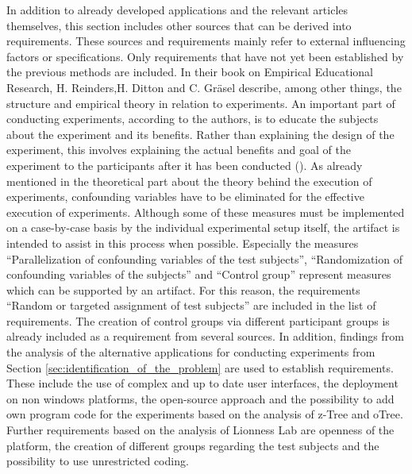   In addition to already developed applications and the relevant articles themselves, this section includes other sources that can be derived into requirements. These sources and requirements mainly refer to external influencing factors or specifications. Only requirements that have not yet been established by the previous methods are included.  
  In their book on Empirical Educational Research, H. Reinders,H. Ditton and C. Gräsel describe, among other things, the structure and empirical theory in relation to experiments. An important part of conducting experiments, according to the authors, is to educate the subjects about the experiment and its benefits. Rather than explaining the design of the experiment, this involves explaining the actual benefits and goal of the experiment to the participants after it has been conducted (\cite{Gniewosz.2011}). As already mentioned in the theoretical part about the theory behind the execution of experiments, confounding variables have to be eliminated for the effective execution of experiments. Although some of these measures must be implemented on a case-by-case basis by the individual experimental setup itself, the artifact is intended to assist in this process when possible. Especially the measures \enquote{Parallelization of confounding variables of the test subjects}, \enquote{Randomization of confounding variables of the subjects} and \enquote{Control group} represent measures which can be supported by an artifact. For this reason, the requirements \enquote{Random or targeted assignment of test subjects} are included in the list of requirements. The creation of control groups via different participant groups is already included as a requirement from several sources. In addition, findings from the analysis of the alternative applications for conducting experiments from Section \ref{sec:identification_of_the_problem} are used to establish requirements. These include the use of complex and up to date user interfaces, the deployment on non windows platforms, the open-source approach and the possibility to add own program code for the experiments based on the analysis of z-Tree and oTree. Further requirements based on the analysis of Lionness Lab are openness of the platform, the creation of different groups regarding the test subjects and the possibility to use unrestricted coding.
  
  

